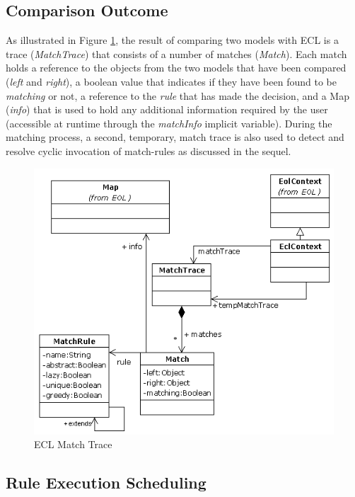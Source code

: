 \subsection{Comparison Outcome}

As illustrated in Figure \ref{fig:ECLRuntime}, the result of comparing two models with ECL is a trace (\emph{MatchTrace}) that consists of a number of matches (\emph{Match}). Each match holds a reference to the objects from the two models that have been compared (\emph{left} and \emph{right}), a boolean value that indicates if they have been found to be \emph{matching} or not, a reference to the \emph{rule} that has made the decision, and a Map (\emph{info}) that is used to hold any additional information required by the user (accessible at runtime through the \emph{matchInfo} implicit variable). During the matching process, a second, temporary, match trace is also used to detect and resolve cyclic invocation of match-rules as discussed in the sequel.

\begin{figure}
	\centering
		\includegraphics{images/ECLRuntime.png}
	\caption{ECL Match Trace}
	\label{fig:ECLRuntime}
\end{figure}

\subsection{Rule Execution Scheduling}

